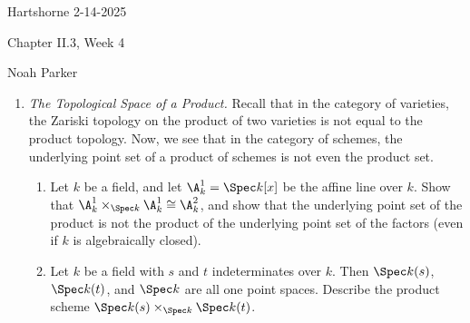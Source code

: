 \documentclass[12pt]{amsart}
\begin{document}
{Hartshorne} \hfill {2-14-2025}

\bigskip\bigskip

\begin{center}

{\sc Chapter II.3, Week 4}

\end{center}

\begin{center}

  {Noah Parker} %
    
\end{center}

\bigskip

\begin{enumerate}
	\item[3.9.] {
      \emph{The Topological Space of a Product.}
      Recall that in the category of varieties, the Zariski topology on the product of two varieties is not equal to the product topology.
      Now, we see that in the category of schemes, the underlying point set of a product of schemes is not even the product set.
      \begin{enumerate}
        \item Let $k$ be a field, and let $\A^1_k=\Spec k[x]$ be the affine line over $k$.
          Show that $\A_k^1\times_{\Spec k}\A_k^1\cong \A_k^2$, and show that the underlying point set of the product is not the product of the underlying point set of the factors (even if $k$ is algebraically closed).
        \item Let $k$ be a field with $s$ and $t$ indeterminates over $k$.
          Then $\Spec k(s)$, $\Spec k(t)$, and $\Spec k$ are all one point spaces.
          Describe the product scheme $\Spec k(s)\times_{\Spec k}\Spec k(t)$.
      \end{enumerate}
    }
\end{enumerate}
\end{document}
